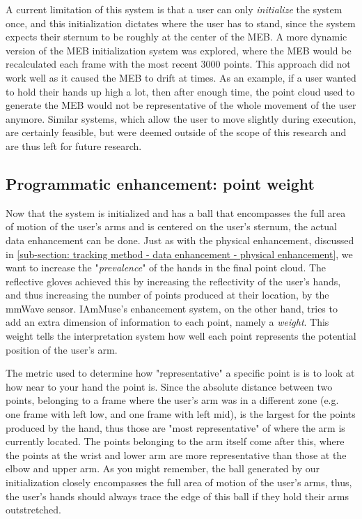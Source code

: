 A current limitation of this system is that a user can only \textit{initialize} the system once, and this initialization dictates where the user has to stand, since the system expects their sternum to be roughly at the center of the MEB.
A more dynamic version of the MEB initialization system was explored, where the MEB would be recalculated each frame with the most recent 3000 points.
This approach did not work well as it caused the MEB to drift at times. 
As an example, if a user wanted to hold their hands up high a lot, then after enough time, the point cloud used to generate the MEB would not be representative of the whole movement of the user anymore.
Similar systems, which allow the user to move slightly during execution, are certainly feasible, but were deemed outside of the scope of this research and are thus left for future research.


\subsection{Programmatic enhancement: point weight}
\label{sub-section: tracking method - data enhancement - programmatic enhancement}

Now that the system is initialized and has a ball that encompasses the full area of motion of the user's arms and is centered on the user's sternum, the actual data enhancement can be done.
Just as with the physical enhancement, discussed in \cref{sub-section: tracking method - data enhancement - physical enhancement}, we want to increase the "\textit{prevalence}" of the hands in the final point cloud.
The reflective gloves achieved this by increasing the reflectivity of the user's hands, and thus increasing the number of points produced at their location, by the mmWave sensor.
IAmMuse's enhancement system, on the other hand, tries to add an extra dimension of information to each point, namely a \textit{weight}.
This weight tells the interpretation system how well each point represents the potential position of the user's arm.

The metric used to determine how "representative" a specific point is is to look at how near to your hand the point is.
Since the absolute distance between two points, belonging to a frame where the user's arm was in a different zone (e.g. one frame with left low, and one frame with left mid), is the largest for the points produced by the hand, thus those are "most representative" of where the arm is currently located.
The points belonging to the arm itself come after this, where the points at the wrist and lower arm are more representative than those at the elbow and upper arm.
As you might remember, the ball generated by our initialization closely encompasses the full area of motion of the user's arms, thus, the user's hands should always trace the edge of this ball if they hold their arms outstretched.

